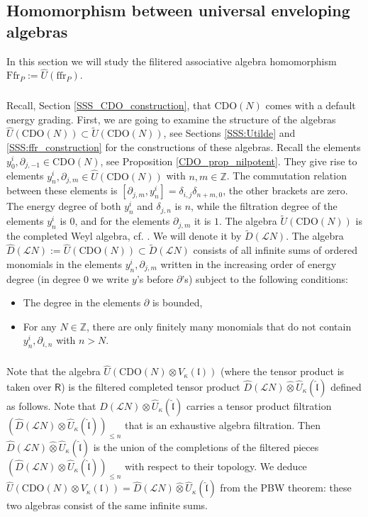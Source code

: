 \documentclass{amsart}
\theoremstyle{definition}
\newcommand{\sss}{\subsubsection{}}
\newcommand{\Ring}{\mathsf{R}}
\newcommand{\ffr}{\mathrm{ffr}}
\newcommand{\Z}{\mathbb{Z}}
\newcommand{\lf}{\mathfrak{l}}
\newcommand{\Loop}{\mathscr{L}}
\newcommand{\CDO}{\mathrm{CDO}}
\newcommand{\Ffr}{\mathrm{{Ffr}}}
\numberwithin{equation}{section}
\begin{document}
\subsection{Homomorphism between universal enveloping algebras}
In this section we will study the filitered associative algebra homomorphism $\Ffr_P:=\widehat{U}(\ffr_P)$.  

\sss
Recall, Section \ref{SSS_CDO_construction}, that $\CDO(N)$ comes with a default energy grading.
First, we are going to examine the structure of the algebras $\widehat{U}(\CDO(N))\subset \widetilde{U}(\CDO(N))$, see Sections \ref{SSS:Utilde} and \ref{SSS:ffr_construction} for the constructions of these algebras.
Recall the elements $y_0^i,\partial_{j,-1}\in \CDO(N)$, see Proposition  \ref{CDO_prop_nilpotent}. They give rise to elements 
$y^i_n, \partial_{j,m}\in \widehat{U}(\CDO(N))$ with $n,m\in \Z$. The commutation relation 
between these elements is $[\partial_{j,m},y^{i}_n]=\delta_{i,j}\delta_{n+m,0}$, the other brackets are zero. The energy degree of both $y^i_n$ and $\delta_{j,n}$ is $n$, while the filtration degree of the elements $y^i_n$ is $0$, and for the elements $\partial_{j,m}$ it is $1$. The algebra $\widetilde{U}(\CDO(N))$ is the completed Weyl algebra, cf. \cite[Section 5.3.3]{Frenkel_loop}. We will denote it by $\widetilde{D}(\Loop N)$.
The algebra $\widehat{D}(\Loop N):=\widehat{U}(\CDO(N))\subset \widetilde{D}(\Loop N)$ consists of all infinite sums of ordered monomials in the elements 
$y^i_n,\partial_{j,m}$ written in the increasing order of energy degree (in degree $0$ we write $y$'s before $\partial$'s) subject to the following conditions:
\begin{itemize}
\item The degree in the elements $\partial$ is bounded,
\item For any $N\in \Z$, there are only finitely many monomials that do not contain $y^i_n,\partial_{i,n}$ with $n>N$.
\end{itemize}

\sss\label{SSS_filt_compl_tensor}
Note that the algebra $\widehat{U}(\CDO(N)\otimes V_\kappa(\lf))$ (where the tensor product is taken over $\Ring$) is the filtered completed tensor product $\widehat{D}(\Loop N)\widehat{\otimes} \widehat{U}_\kappa(\hat{\lf})$ defined as follows. Note that
$\widehat{D}(\Loop N)\otimes \widehat{U}_\kappa(\hat{\lf})$ carries a tensor product filtration $(\widehat{D}(\Loop N)\otimes \widehat{U}_\kappa(\hat{\lf}))_{\leqslant n}$ that is an exhaustive algebra filtration. Then $\widehat{D}(\Loop N)\widehat{\otimes} \widehat{U}_\kappa(\hat{\lf})$ is the union of the completions of the filtered pieces $(\widehat{D}(\Loop N)\otimes \widehat{U}_\kappa(\hat{\lf}))_{\leqslant n}$ with respect to their topology. 
We deduce $\widehat{U}(\CDO(N)\otimes V_\kappa(\lf))=\widehat{D}(\Loop N)\widehat{\otimes} \widehat{U}_\kappa(\hat{\lf})$ from the PBW theorem: these two algebras consist of the same infinite sums.
\end{document}

